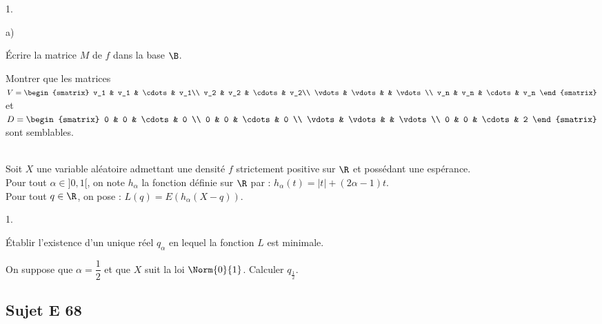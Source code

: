 \documentclass[11pt]{article}%
\begin{document}
\begin{exerciceAP}
\begin{noliste}{1.}
  \item
    \begin{noliste}{a)}
    \setlength{\itemsep}{2mm}
    \item Écrire la matrice $M$ de $f$ dans la base $\B$.
    \item Montrer que les matrices $V =
      \begin{smatrix}
	v_1 & v_1 & \cdots & v_1\\
	v_2 & v_2 & \cdots & v_2\\
	\vdots & \vdots & & \vdots\\
	v_n & v_n & \cdots & v_n
      \end{smatrix}$ et $D = 
      \begin{smatrix}
        0 & 0 & \cdots & 0 \\
        0 & 0 & \cdots & 0 \\
        \vdots & \vdots & & \vdots\\
        0 & 0 & \cdots & 2
      \end{smatrix}$ sont semblables.
    \end{noliste}
  \end{noliste}
\end{exerciceAP}


\begin{exerciceSP}~\\
  Soit $X$ une variable aléatoire admettant une densité $f$
  strictement positive sur $\R$ et possédant une espérance.\\
  Pour tout $\alpha\in]0,1[$, on note $h_\alpha$ la fonction définie
  sur $\R$ par : $h_\alpha(t)=\vert t \vert + (2\alpha -1)t$.\\
  Pour tout $q\in\R$, on pose : $L(q)=E\left(h_\alpha(X-q)\right)$.
  \begin{noliste}{1.}
    \setlength{\itemsep}{2mm}
  \item Établir l'existence d'un unique réel $q_\alpha$ en lequel la
    fonction $L$ est minimale.
  \item On suppose que $\alpha=\dfrac{1}{2}$ et que $X$ suit la loi
    $\Norm{0}{1}$. Calculer $q_{\frac{1}{2}}$.
  \end{noliste}
\end{exerciceSP}



\subsection*{Sujet E 68}
\end{document}
